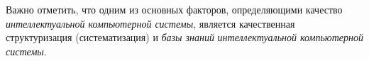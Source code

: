 Важно отметить, что одним из основных факторов, определяющими качество \textit{интеллектуальной компьютерной системы}, является качественная структуризация (систематизация) и  \textit{базы знаний} \textit{интеллектуальной компьютерной системы}.

